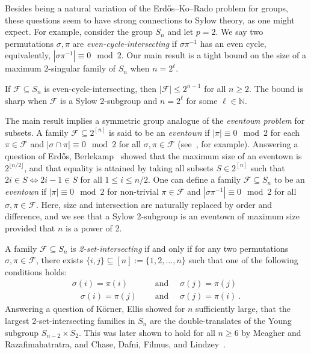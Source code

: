 \documentclass[12pt]{article}
\begin{document}
Besides being a natural variation of the Erd\H{o}s--Ko--Rado problem for groups, these questions seem to have strong connections to Sylow theory, as one might expect. For example, consider the group $S_n$ and let $p=2$. We say two permutations $\sigma,\pi$ are \emph{even-cycle-intersecting} if $\sigma \pi^{-1}$ has an even cycle, equivalently, $|\sigma \pi^{-1}| \equiv 0 \mod 2$.  Our main result is a tight bound on the size of a maximum $2$-singular family of $S_n$ when $n = 2^\ell$. 


\begin{theorem}\label{thm:main}
If $\mathcal{F} \subseteq S_n$ is even-cycle-intersecting, then $|\mathcal{F}| \leq 2^{n-1}$ for all $n \geq 2$.
The bound is sharp when $\mathcal{F}$ is a Sylow 2-subgroup and $n = 2^\ell$ for some $\ell \in \mathbb{N}$.
\end{theorem} 
\noindent The main result implies a symmetric group analogue of the \emph{eventown problem} for subsets. A family $\mathcal{F} \subseteq 2^{[n]}$ is said to be an \emph{eventown} if $| \pi | \equiv 0 \mod 2$ for each $\pi \in \mathcal{F}$ and $| \sigma \cap \pi | \equiv 0 \mod 2$ for all $\sigma, \pi \in \mathcal{F}$ (see~\cite[Ch.~1]{BF92}, for example). 
Answering a question of Erd\H{o}s, Berlekamp~\cite{Berlekamp69} showed that the maximum size of an eventown is $2^{\lfloor n/2 \rfloor}$, and that equality is attained by taking all subsets $S \in 2^{[n]}$ such that $2i \in S \Leftrightarrow 2i-1 \in S$ for all $1 \leq i \leq n/2$. One can define a family $\mathcal{F} \subseteq S_n$ to be an \emph{eventown} if $| \pi | \equiv 0 \mod 2$ for non-trivial $\pi \in \mathcal{F}$ and $| \sigma \pi^{-1} | \equiv 0 \mod 2$ for all $\sigma, \pi \in \mathcal{F}$. Here, size and intersection are naturally replaced by order and difference, and we see that a Sylow 2-subgroup is an eventown of maximum size provided that $n$ is a power of 2. 

A family $\mathcal{F} \subseteq S_n$ is \emph{2-set-intersecting} if and only if for any two
permutations $\sigma, \pi \in \mathcal{F}$, there exists $\{i, j\} \subseteq [n] := \{1,2,\ldots,n\}$ such that one of the following conditions holds: 
\begin{align}
\sigma(i) = \pi(i) \quad &\text{   and   } \quad  \sigma(j) = \pi(j) \\
 \quad \sigma(i) = \pi(j) \quad &\text{  and   } \quad \sigma(j) = \pi(i)~.
\end{align}
Answering a question of K\"orner, Ellis showed for $n$ sufficiently large, that the largest 2-set-intersecting families in $S_n$ are the double-translates of the Young subgroup $S_{n-2} \times S_2$. This was later shown to hold for all $n \geq 6$ by Meagher and Razafimahatratra, and Chase, Dafni, Filmus, and Lindzey~\cite{MeagherR21,2perm}.
\end{document}
